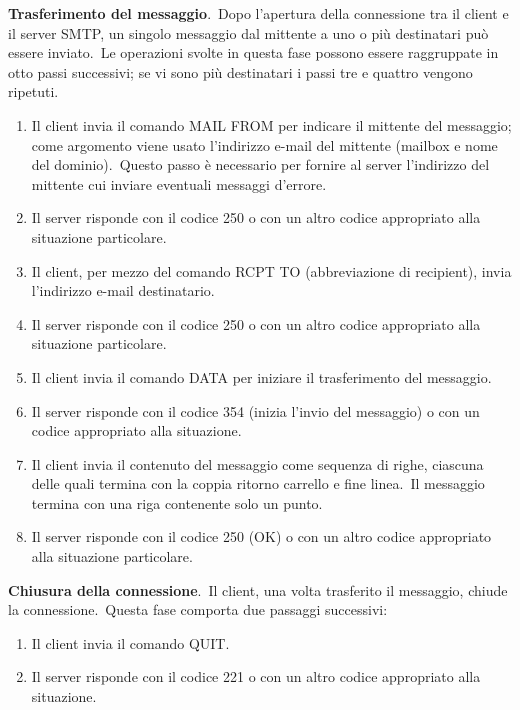 \textbf{Trasferimento del messaggio}.\
Dopo l'apertura della connessione tra il client e il server SMTP, un singolo messaggio dal mittente a uno o più destinatari può essere inviato.\
Le operazioni svolte in questa fase possono essere raggruppate in otto passi successivi; se vi sono più destinatari i passi tre e quattro vengono ripetuti.

\begin{enumerate}
    \item Il client invia il comando MAIL FROM per indicare il mittente del messaggio; come argomento viene usato l'indirizzo e-mail del mittente (mailbox e nome del dominio).\ Questo passo è necessario per fornire al server l'indirizzo del mittente cui inviare eventuali messaggi d'errore.
    \item Il server risponde con il codice 250 o con un altro codice appropriato alla situazione particolare.
    \item Il client, per mezzo del comando RCPT TO (abbreviazione di recipient), invia l'indirizzo e-mail destinatario.
    \item Il server risponde con il codice 250 o con un altro codice appropriato alla situazione particolare.
    \item Il client invia il comando DATA per iniziare il trasferimento del messaggio.
    \item Il server risponde con il codice 354 (inizia l'invio del messaggio) o con un codice appropriato alla situazione.
    \item Il client invia il contenuto del messaggio come sequenza di righe, ciascuna delle quali termina con la coppia ritorno carrello e fine linea.\ Il messaggio termina con una riga contenente solo un punto.
    \item Il server risponde con il codice 250 (OK) o con un altro codice appropriato alla situazione particolare.
\end{enumerate}

\textbf{Chiusura della connessione}.\
Il client, una volta trasferito il messaggio, chiude la connessione.\
Questa fase comporta due passaggi successivi:

\begin{enumerate}
    \item Il client invia il comando QUIT.
    \item Il server risponde con il codice 221 o con un altro codice appropriato alla situazione.
\end{enumerate}

